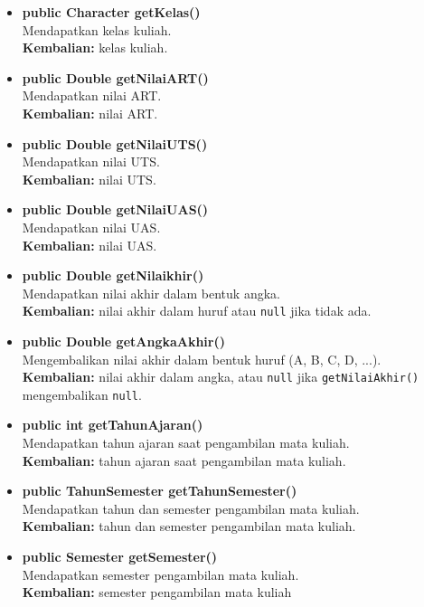 \begin{enumerate}
\begin{enumerate}
\begin{itemize}
			\item \textbf{public Character getKelas()}\\
				Mendapatkan kelas kuliah.\\
				\textbf{Kembalian:} kelas kuliah.
				
			\item \textbf{public Double getNilaiART()}\\
				Mendapatkan nilai ART.\\
				\textbf{Kembalian:} nilai ART.
				
			\item \textbf{public Double getNilaiUTS()}\\
				Mendapatkan nilai UTS.\\
				\textbf{Kembalian:} nilai UTS.
				
			\item \textbf{public Double getNilaiUAS()}\\
				Mendapatkan nilai UAS.\\
				\textbf{Kembalian:} nilai UAS.
				
			\item \textbf{public Double getNilaikhir()}\\
				Mendapatkan nilai akhir dalam bentuk angka.\\
				\textbf{Kembalian:} nilai akhir dalam huruf atau \texttt{null} jika tidak ada.
			
			\item \textbf{public Double getAngkaAkhir()}\\
				Mengembalikan nilai akhir dalam bentuk huruf (A, B, C, D, ...).\\
				\textbf{Kembalian:} nilai akhir dalam angka, atau \texttt{null} jika \texttt{getNilaiAkhir()} mengembalikan \texttt{null}.
			
			\item \textbf{public int getTahunAjaran()}\\
				Mendapatkan tahun ajaran saat pengambilan mata kuliah.\\
				\textbf{Kembalian:} tahun ajaran saat pengambilan mata kuliah.
			
			\item \textbf{public TahunSemester getTahunSemester()}\\
				Mendapatkan tahun dan semester pengambilan mata kuliah.\\
				\textbf{Kembalian:} tahun dan semester pengambilan mata kuliah.	
				
			\item \textbf{public Semester getSemester()}\\
				Mendapatkan semester pengambilan mata kuliah.\\
				\textbf{Kembalian:} semester pengambilan mata kuliah
		\end{itemize}
		

\end{enumerate}
\end{enumerate}
